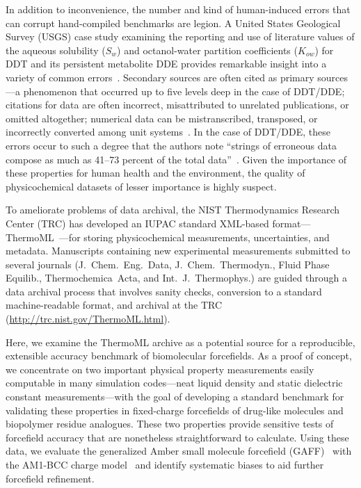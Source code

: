 \documentclass[journal=jacsat,manuscript=article]{achemso}
\begin{document}
In addition to inconvenience, the number and kind of human-induced errors that can corrupt hand-compiled benchmarks are legion.
A United States Geological Survey (USGS) case study examining the reporting and use of literature values of the aqueous solubility ($S_w$) and octanol-water partition coefficients ($K_{ow}$) for DDT and its persistent metabolite DDE provides remarkable insight into a variety of common errors~\cite{usgs-ddt-report}.
Secondary sources are often cited as primary sources---a phenomenon that occurred up to five levels deep in the case of DDT/DDE;
citations for data are often incorrect, misattributed to unrelated publications, or omitted altogether;
numerical data can be mistranscribed, transposed, or incorrectly converted among unit systems~\cite{usgs-ddt-report}.
In the case of DDT/DDE, these errors occur to such a degree that the authors note ``strings of erroneous data compose as much as 41--73 percent of the total data''~\cite{usgs-ddt-report}.
Given the importance of these properties for human health and the environment, the quality of physicochemical datasets of lesser importance is highly suspect.

To ameliorate problems of data archival, the NIST Thermodynamics Research Center (TRC) has developed an IUPAC standard XML-based format---ThermoML~\cite{frenkel2003thermoml, frenkel2006xml, chirico2013improvement}---for storing physicochemical measurements, uncertainties, and metadata.
Manuscripts containing new experimental measurements submitted to several journals (J.~Chem.~Eng.~Data, J.~Chem.~Thermodyn., Fluid Phase Equilib., Thermochemica~Acta, and Int.~J.~Thermophys.) are guided through a data archival process that involves sanity checks, conversion to a standard machine-readable format, and archival at the TRC (\url{http://trc.nist.gov/ThermoML.html}).  

Here, we examine the ThermoML archive as a potential source for a reproducible, extensible accuracy benchmark of biomolecular forcefields.
As a proof of concept, we concentrate on two important physical property measurements easily computable in many simulation codes---neat liquid density and static dielectric constant measurements---with the goal of developing a standard benchmark for validating these properties in fixed-charge forcefields of drug-like molecules and biopolymer residue analogues.  
These two properties provide sensitive tests of forcefield accuracy that are nonetheless straightforward to calculate.  
Using these data, we evaluate the generalized Amber small molecule forcefield (GAFF)~\cite{gaff,gaff2} with the AM1-BCC charge model~\cite{am1bcc1,am1bcc2} and identify systematic biases to aid further forcefield refinement.
\end{document}
